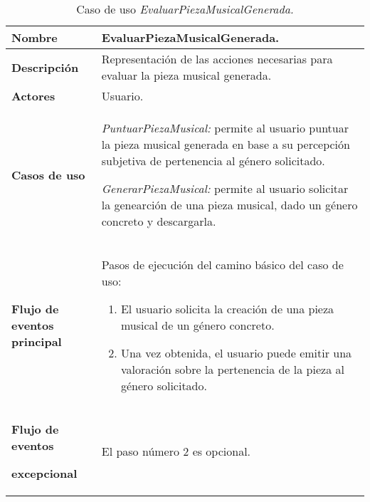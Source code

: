 \begin{longtable}{|>{\columncolor[rgb]{0.75,0.75,0.75}}p{3cm}|p{11cm}|}
\caption{Caso de uso \emph{EvaluarPiezaMusicalGenerada.}} \\
\hline \centerline{\textcolor[rgb]{1.00,1.00,1.00}{\textbf{\small
Nombre}}} & {\small EvaluarPiezaMusicalGenerada.}
\\
\hline \centerline{\textcolor[rgb]{1.00,1.00,1.00}{\textbf{\small
Descripción}}} & {\small Representación de las acciones necesarias para evaluar la pieza musical generada.}
\\
\hline \centerline{\textcolor[rgb]{1.00,1.00,1.00}{\textbf{\small
Actores}}} & {\small Usuario.}
\\
\hline
\begin{center}
\textcolor[rgb]{1.00,1.00,1.00}{\textbf{\small Casos de uso}}
\end{center}
\begin{center}

\end{center}
& {\small \emph{PuntuarPiezaMusical:} permite al usuario puntuar la pieza musical generada en base a su percepción subjetiva de pertenencia al género solicitado.}

{\small \emph{GenerarPiezaMusical:} permite al usuario solicitar la genearción de una pieza musical, dado un género concreto y descargarla.}

\\
\hline
\begin{center}
\end{center}
\begin{center}
\textcolor[rgb]{1.00,1.00,1.00}{\textbf{\small Flujo de eventos
principal}}
\end{center}
& {\small Pasos de ejecución del camino básico del caso de uso:}

{\small
\begin{enumerate}
    \item  El usuario solicita la creación de una pieza musical de un género concreto.

    \item  Una vez obtenida, el usuario puede emitir una valoración sobre la pertenencia de la pieza al género solicitado.
\end{enumerate}
}
\\
\hline \centerline{\textcolor[rgb]{1.00,1.00,1.00}{\textbf{\small
Flujo de eventos}}}
\centerline{\textcolor[rgb]{1.00,1.00,1.00}{\textbf{\small
excepcional}}} & {\small El paso número 2 es opcional.}
\\
\hline
\end{longtable}